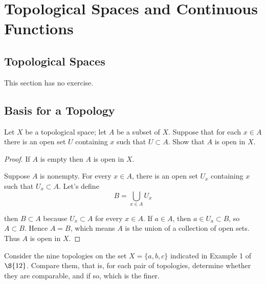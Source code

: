 \chapter{Topological Spaces and Continuous Functions}

\section{Topological Spaces}

This section has no exercise.

\section{Basis for a Topology}

\begin{exercise}\label{chapter2:section13:exercise1}
    Let $X$ be a topological space; let $A$ be a subset of $X$. Suppose that for each $x\in A$ there is an open set $U$ containing $x$ such that $U\subset A$. Show that $A$ is open in $X$.
\end{exercise}

\begin{proof}
    If $A$ is empty then $A$ is open in $X$.

    Suppose $A$ is nonempty. For every $x\in A$, there is an open set $U_{x}$ containing $x$ such that $U_{x}\subset A$. Let's define
    \[
        B = \bigcup_{x\in A}U_{x}
    \]

    then $B\subset A$ because $U_{x}\subset A$ for every $x\in A$. If $a\in A$, then $a\in U_{a}\subset B$, so $A\subset B$. Hence $A = B$, which means $A$ is the union of a collection of open sets. Thus $A$ is open in $X$.
\end{proof}

\begin{exercise}\label{chapter2:section13:exercise2}
    Consider the nine topologies on the set $X = \{ a, b, c \}$ indicated in Example 1 of $\S{12}$. Compare them, that is, for each pair of topologies, determine whether they are comparable, and if so, which is the finer.
\end{exercise}

